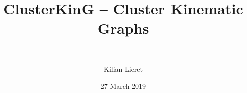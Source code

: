 %
\title{ClusterKinG -- Cluster Kinematic Graphs}
\subtitle{\ \relax}
\author{Kilian Lieret}
\newcommand*{\coauthors}{}
\date{27 March 2019}
%
%